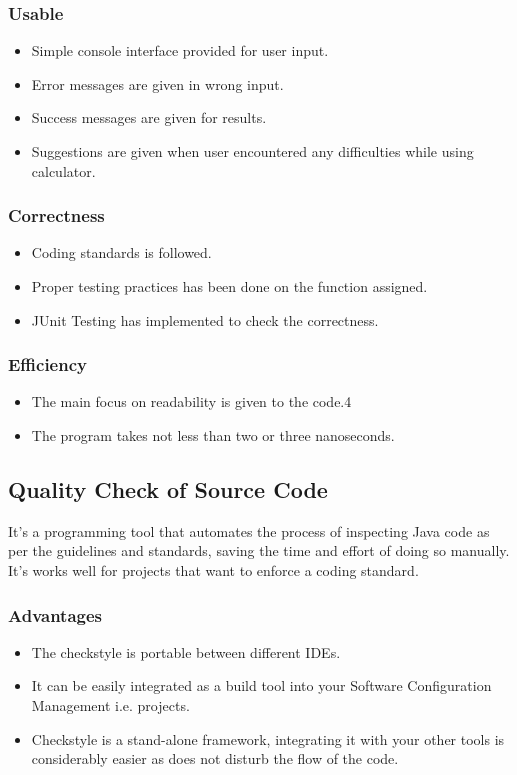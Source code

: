 \documentclass{article}
\begin{document}
    \subsubsection{Usable}
        \begin{itemize}
            \item Simple console interface provided for user input.
            \item Error messages are given in wrong input.
            \item Success messages are given for results.
            \item Suggestions are given when user encountered any difficulties while using calculator.
        \end{itemize}
        
    \subsubsection{Correctness}
        \begin{itemize}
            \item Coding standards is followed.
            \item Proper testing practices has been done on the function assigned. 
            \item JUnit Testing has implemented to check the correctness. 
        \end{itemize}
    \subsubsection{Efficiency}
    \begin{itemize}
        \item The main focus on readability is given to the code.4
        \item The program takes not less than two or three nanoseconds.
    \end{itemize}
    \newline
    \subsection{Quality Check of Source Code}
    It's a programming tool that automates the process of inspecting Java code as per the guidelines and standards, saving the time and effort of doing so manually. It's works well for projects that want to enforce a coding standard.
    \subsubsection*{Advantages}
    \begin{itemize}
        \item The checkstyle is portable between different IDEs.
        \item It can be easily integrated as a build tool into your Software Configuration Management i.e. projects.
        \item Checkstyle is a stand-alone framework, integrating it with your other tools is considerably easier as does not disturb the flow of the code.
    \end{itemize}
\end{document}
